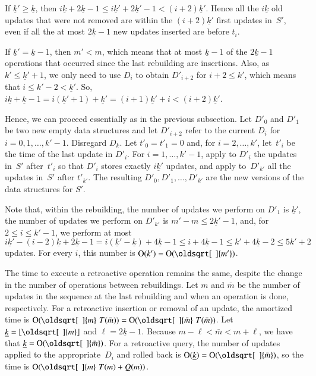 \documentclass[3p,times,procedia]{elsarticle}
\DeclarePairedDelimiter\floor{\lfloor}{\rfloor}
\renewcommand{\sqrt}[2][\mkern8mu]{\mkern-1mu\mathop{\oldsqrt[#1]{#2}}}
\newcommand{\Oh}{\mathrm{O}}
\begin{document}
If $\underline{k}' \geq \underline{k}$, then
$i\underline{k}+2\underline{k}-1 \leq i\underline{k}'+2\underline{k}'-1 < (i+2)\underline{k}'$.
Hence all the $i\underline{k}$ old updates that were not removed 
are within the $(i+2)\underline{k}'$ first updates in~$S'$, 
even if all the at most $2\underline{k}-1$ new updates inserted are before $t_i$. 

If $\underline{k}' = \underline{k}-1$, then $m'<m$, 
which means that at most $\underline{k}-1$ of the $2\underline{k}-1$ 
operations that occurred since the last rebuilding are insertions. 
Also, as $k' \leq \underline{k}'+1$, 
we only need to use $D_i$ to obtain $D'_{i+2}$ for $i+2 \leq k'$, 
which means that $i \leq k'-2 < \underline{k}'$.  
So, $i\underline{k}+\underline{k}-1 = i(\underline{k}'+1)+\underline{k}' 
= (i+1)\underline{k}'+i <  (i+2)\underline{k}'$. 

Hence, we can proceed essentially as in the previous subsection.
Let $D'_0$ and $D'_1$ be two new empty data structures 
and let $D'_{i+2}$ refer to the current $D_i$ for~$i=0,1,\ldots,k'-1$.  Disregard $D_k$.   
Let $t'_0 = t'_1 = 0$ and, for $i=2,\ldots,k'$, 
let~$t'_i$ be the time of the last update in $D'_i$.
For $i=1,\ldots,k'-1$, apply to $D'_i$ the updates in~$S'$ 
after~$t'_i$ so that $D'_i$ stores exactly $i\underline{k}'$ updates, 
and apply to~$D'_{k'}$ all the updates in~$S'$ after $t'_{k'}$. 
The resulting $D'_0,D'_1,\ldots,D'_{k'}$ are the new versions of the data structures for $S'$. 

Note that, within the rebuilding, 
the number of updates we perform on $D'_1$ is $\underline{k}'$, 
the number of updates we perform on $D'_{k'}$ is $m'-m \leq 2\underline{k}'-1$, 
and, for $2 \leq i \leq k'-1$, we perform at most 
$i\underline{k}' - (i-2)\underline{k}+2\underline{k}-1
 = i(\underline{k}'-\underline{k})+4\underline{k}-1 
\leq i+4\underline{k}-1 \leq k'+4\underline{k}-2 \leq 5k'+2$ updates. 
For every $i$, this number is $\Oh(k') = \Oh(\sqrt{m'})$.


The time to execute a retroactive operation remains the same, 
despite the change in the number of operations between rebuildings.
Let $m$ and $\bar{m}$ be the number of updates in the sequence at 
the last rebuilding and when an operation is done, respectively.
For a retroactive insertion or removal of an update, the amortized time 
is $\Oh(\sqrt{m}\,T(\bar{m})) = \Oh(\sqrt{\bar{m}}\,T(\bar{m}))$.  
Let $\underline{k} = \floor{\sqrt{m}}$ and $\ell = 2\underline{k}-1$. 
Because $m-\ell < \bar{m} < m+\ell$, we have that $\underline{k} = \Oh(\sqrt{\bar{m}})$. 
For a retroactive query, the number of updates applied to the 
appropriate~$D_i$ and rolled back is $\Oh(\underline{k}) = \Oh(\sqrt{\bar{m}})$, 
so the time is $\Oh(\sqrt{m}\,T(m)+Q(m))$.  
\end{document}
